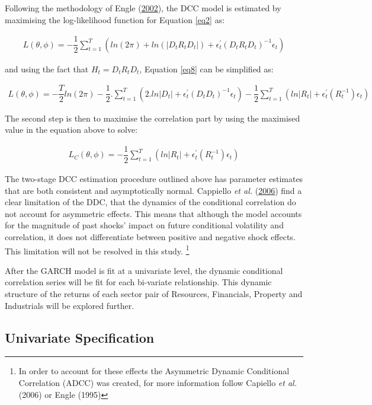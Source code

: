 \documentclass[11pt,preprint, authoryear]{elsarticle}
\numberwithin{equation}{section}
\numberwithin{figure}{section}
\numberwithin{table}{section}
\let\rmarkdownfootnote\footnote%
\def\footnote{\protect\rmarkdownfootnote}
\begin{document}
Following the methodology of Engle
(\protect\hyperlink{ref-engle2002}{2002}), the DCC model is estimated by
maximising the log-likelihood function for Equation \ref{eq2} as:

\begin{align}
  L(\theta, \phi) = -\dfrac{1}{2} \sum_{t=1}^T (ln(2\pi) + ln(\left|D_tR_tD_t\right|) + \epsilon_t^{'}(D_tR_tD_t)^{-1}\epsilon_t)  \label{eq8}
\end{align}

and using the fact that \(H_t = D_tR_tD_t\), Equation \ref{eq8} can be
simplified as:

\begin{align}
  L(\theta, \phi) = -\dfrac{T}{2} ln(2\pi) - \dfrac{1}{2} . \sum_{t=1}^T (2 . ln \left| D_t \right| + \epsilon_t^{'} (D_tD_t)^{-1} \epsilon_t) - \dfrac{1}{2}\sum_{t=1}^T (ln\left| R_t \right| + \epsilon_t^{'} (R_t^{-1}) \epsilon_t)  \label{eq9}
\end{align}

The second step is then to maximise the correlation part by using the
maximised value in the equation above to solve:

\begin{align}
  L_C(\theta, \phi) = -\dfrac{1}{2}\sum_{t=1}^T (ln\left| R_t \right| + \epsilon_t^{'} (R_t^{-1}) \epsilon_t) \label{eq10}
\end{align}

The two-stage DCC estimation procedure outlined above has parameter
estimates that are both consistent and asymptotically normal. Cappiello
\emph{et al.} (\protect\hyperlink{ref-cappiello2006asymmetric}{2006})
find a clear limitation of the DDC, that the dynamics of the conditional
correlation do not account for asymmetric effects. This means that
although the model accounts for the magnitude of past shocks' impact on
future conditional volatility and correlation, it does not differentiate
between positive and negative shock effects. This limitation will not be
resolved in this study.
\footnote{In order to account for these effects the Asymmetric Dynamic Conditional Correlation (ADCC) was created, for more information follow Capiello \emph{et al.} (2006) or Engle (1995)}

After the GARCH model is fit at a univariate level, the dynamic
conditional correlation series will be fit for each bi-variate
relationship. This dynamic structure of the returns of each sector pair
of Resources, Financials, Property and Industrials will be explored
further.

\hypertarget{univariate-specification}{%
\subsection{Univariate Specification}\label{univariate-specification}}
\end{document}
